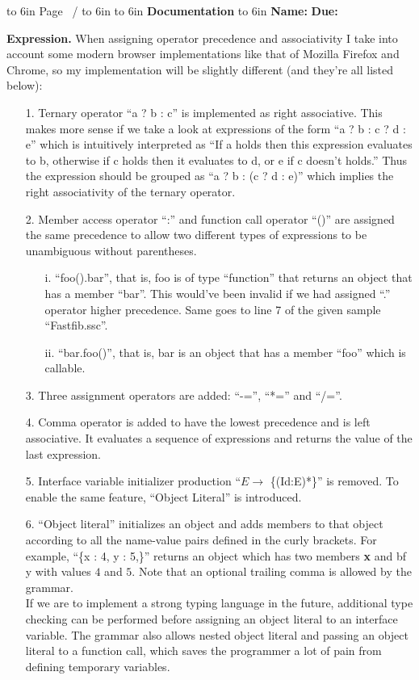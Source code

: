 \documentclass[12pt]{article}
\newcommand{\header}[1]
{
    \begin{center}
    \framebox
    {
        \vbox
        {
            \hbox to 6in {{\bf \CourseName}  \hfill Page \thepage\ / \pageref{LastPage}}
            \vspace{4mm}
            \hbox to 6in {{\hfill \AssignmentType \Number \hfill}}
            \vspace{4mm}
            \hbox to 6in {{\Large \hfill {\bf #1} \hfill}}
            \vspace{4mm}
            \hbox to 6in {{\bf Name:} \Student \space {\bf No.} \NetID \hfill {\bf Due:} \Due}
        }
    }
    \end{center}
}
\begin{document}
\header{Documentation}
\vspace{4mm}
{\bf Expression.} When assigning operator precedence and associativity I take into
account some modern browser implementations like that of Mozilla Firefox and Chrome, so
my implementation will be slightly different (and they're all listed below):

\begin{itemize}
\item[1.] Ternary operator ``a ? b : c'' is implemented as right associative. This makes
  more sense if we take a look at expressions of the form ``a ? b : c ? d : e'' which is
  intuitively interpreted as ``If a holds then this expression evaluates to b, otherwise
  if c holds then it evaluates to d, or e if c doesn't holds.'' Thus the expression should
  be grouped as ``a ? b : (c ? d : e)'' which implies the right associativity of the
  ternary operator.
\item[2.] Member access operator ``:'' and function call operator ``()'' are assigned the
  same precedence to allow two different types of expressions to be unambiguous without
  parentheses.
  \begin{itemize}
  \item[i.] ``foo().bar'', that is, foo is of type ``function'' that returns an object that
    has a member ``bar''. This would've been invalid if we had assigned ``.'' operator higher
    precedence. Same goes to line 7 of the given sample ``Fastfib.ssc''.
  \item[ii.] ``bar.foo()'', that is, bar is an object that has a member ``foo'' which is
    callable.
  \end{itemize}
\item[3.] Three assignment operators are added: ``-='', ``*='' and ``/=''.
\item[4.] Comma operator is added to have the lowest precedence and is left associative.
  It evaluates a sequence of expressions and returns the value of the last expression.
\item[5.] Interface variable initializer production ``$E \rightarrow$ \{(Id:E)*\}'' is
  removed. To enable the same feature, ``Object Literal'' is introduced.
\item[6.] ``Object literal'' initializes an object and adds members to that object according
  to all the name-value pairs defined in the curly brackets. For example, ``\{x : 4, y : 5,\}''
  returns an object which has two members {\bf x} and {bf y} with values $4$ and $5$. Note that
  an optional trailing comma is allowed by the grammar.\\
  If we are to implement a strong typing language in the future, additional type checking can
  be performed before assigning an object literal to an interface variable. The grammar also
  allows nested object literal and passing an object literal to a function call, which saves
  the programmer a lot of pain from defining temporary variables.
\end{itemize}
\end{document}
